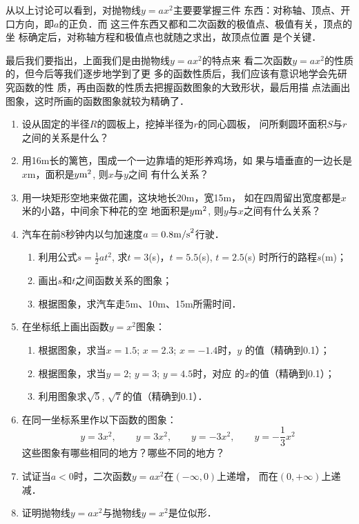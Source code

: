 从以上讨论可以看到，对抛物线$y=ax^2$主要要掌握三件
东西：对称轴、顶点、开口方向，即$a$的正负．而
这三件东西又都和二次函数的极值点、极值有关，顶点的坐
标确定后，对称轴方程和极值点也就随之求出，故顶点位置
是个关键．

最后我们要指出，上面我们是由抛物线$y=ax^2$的特点来
看二次函数$y=ax^2$的性质的，但今后等我们逐步地学到了更
多的函数性质后，我们应该有意识地学会先研究函数的性
质，再由函数的性质去把握函数图象的大致形状，最后用描
点法画出图象，这时所画的函数图象就较为精确了．


\begin{ex}
\begin{enumerate}
    \item 设从固定的半径$R$的圆板上，挖掉半径为$r$的同心圆板，
    问所剩圆环面积$S$与$r$之间的关系是什么？
    \item 用16m长的篱笆，围成一个一边靠墙的矩形养鸡场，如
    果与墙垂直的一边长是$x$m，面积是$y{\rm m}^2$, 则$x$与$y$之间
    有什么关系？
    \item     用一块矩形空地来做花圃，这块地长20m，宽15m，
    如在四周留出宽度都是$x$米的小路，中间余下种花的空
地面积是$y{\rm m}^2$, 则$y$与$x$之间有什么关系？
\item  汽车在前8秒钟内以匀加速度$a=0.8{\rm m/s}^2$行驶．
\begin{enumerate}
\item 利用公式$s=\frac{1}{2}at^2$, 求$t=3$(s)，$t=5.5$(s), $t=2.5$(s) 时所行的路程$s$(m)；
\item 画出$s$和$t$之间函数关系的图象；
\item 根据图象，求汽车走5m、10m、15m所需时间．
\end{enumerate}

\item  
在坐标纸上画出函数$y=x^2$图象：
\begin{enumerate}
\item 根据图象，求当$x=1.5$; $x=2.3$; $x=-1.4$时，$y$
的值（精确到0.1）；
\item 根据图象，求当$y=2$; $y=3$; $y=4.5$时，对应
的$x$的值（精确到0.1）；
\item 利用图象求$\sqrt{5}$, $\sqrt{7}$的值（精确到0.1）．
\end{enumerate}

\item   在同一坐标系里作以下函数的图象：
$$y=3x^2,\qquad y=3x^2,\qquad y=-3x^2,\qquad y=-\frac{1}{3}x^2$$
这些图象有哪些相同的地方？哪些不同的地方？
\item  试证当$a<0$时，二次函数$y=ax^2$在$(-\infty,0)$上递增，
而在$(0,+\infty)$上递减．
\item   证明抛物线$y=ax^2$与抛物线$y=x^2$是位似形．
\end{enumerate}
\end{ex}

